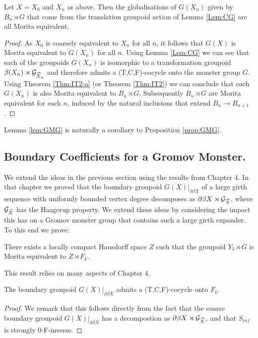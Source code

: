\begin{example}
\begin{proposition}\label{prop:GMG}
Let $X=X_{0}$ and $X_{n}$ as above. Then the globalisations of $G(X_{n})$ given by $B_{n}\rtimes G$ that come from the translation groupoid action of Lemma \ref{Lem:CG} are all Morita equivalent.
\end{proposition}
\begin{proof}
As $X_{0}$ is coarsely equivalent to $X_{n}$ for all $n$, it follows that $G(X)$ is Morita equivalent to $G(X_{n})$ for all $n$. Using Lemma \ref{Lem:CG} we can see that each of the groupoids $G(X_{n})$ is isomorphic to a transformation groupoid $\beta(X_{n}) \rtimes \mathcal{G}_{\widehat{X}_{n}}$ and therefore admits a (T,C,F)-cocycle onto the monster group $G$. Using Theorem \ref{Thm:IT2-a} (or Theorem \ref{Thm:IT2}) we can conclude that each $G(X_{n})$ is also Morita equivalent to $B_{n}\rtimes G$. Subsequently $B_{n}\rtimes G$ are Morita equivalent for each $n$, induced by the natural inclusions that extend $B_{n} \rightarrow B_{n+1}$.  
\end{proof}

Lemma \ref{lem:GMG} is naturally a corollary to Proposition \ref{prop:GMG}.

\subsection{Boundary Coefficients for a Gromov Monster.}

We extend the ideas in the previous section using the results from Chapter 4. In that chapter we proved that the boundary groupoid $G(X)|_{\partial\beta X}$ of a large girth sequence with uniformly bounded vertex degree decomposes as $\partial\beta X \rtimes \mathcal{G}_{\widehat{X}}$, where $\mathcal{G}_{\widehat{X}}$ has the Haagerup property. We extend these ideas by considering the impact this has on a Gromov monster group that contains such a large girth expander. To this end we prove:

\begin{theorem}\label{Thm:GM2}
There exists a locally compact Hausdorff space $Z$ such that the groupoid $Y_{3}\rtimes G$ is Morita equivalent to $Z \rtimes F_{k}$.
\end{theorem}

This result relies on many aspects of Chapter 4.

\begin{lemma}\label{Lem:MEFree}
The boundary groupoid $G(X)|_{\partial\beta X}$ admits a (T,C,F)-cocycle onto $F_{k}$. 
\end{lemma}
\begin{proof}
We remark that this follows directly from the fact that the coarse boundary groupoid $G(X)|_{\partial\beta X}$ has a decompostion as $\partial\beta X \rtimes \mathcal{G}_{\widehat{X}}$, and that $S_{inf}$ is strongly $0$-F-inverse.
\end{proof}


\end{example}
